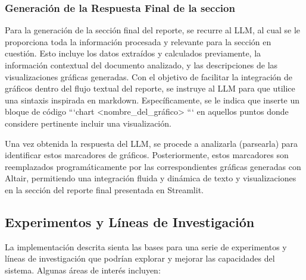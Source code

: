 \subsubsection{Generación de la Respuesta Final de la seccion}

Para la generación de la sección final del reporte, se recurre al LLM, al cual se le proporciona toda la información procesada y relevante para la sección en cuestión. Esto incluye los datos extraídos y calculados previamente, la información contextual del documento analizado, y las descripciones de las visualizaciones gráficas generadas. Con el objetivo de facilitar la integración de gráficos dentro del flujo textual del reporte, se instruye al LLM para que utilice una sintaxis inspirada en markdown. Específicamente, se le indica que inserte un bloque de código ```chart <nombre\_del\_gráfico> ``` en aquellos puntos donde considere pertinente incluir una visualización.

Una vez obtenida la respuesta del LLM, se procede a analizarla (parsearla) para identificar estos marcadores de gráficos. Posteriormente, estos marcadores son reemplazados programáticamente por las correspondientes gráficas generadas con Altair, permitiendo una integración fluida y dinámica de texto y visualizaciones en la sección del reporte final presentada en Streamlit.

\subsection{Experimentos y Líneas de Investigación}

La implementación descrita sienta las bases para una serie de experimentos y líneas de investigación que podrían explorar y mejorar las capacidades del sistema.  Algunas áreas de interés incluyen:

